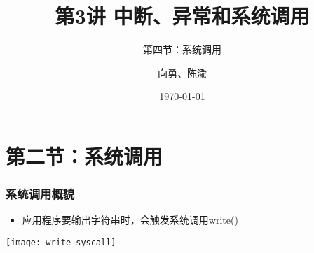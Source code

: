 


\title[第3讲]{第3讲 中断、异常和系统调用} %
\subtitle{第四节：系统调用}
\author{向勇、陈渝} %
\date{\today} %



\begin{frame}
\titlepage %
\end{frame}

\section{第二节：系统调用}%

\begin{frame}[plain]	
	\frametitle{系统调用概貌}
	
	\begin{itemize}
		\item 应用程序要输出字符串时，会触发系统调用write()
	\end{itemize}\pause
	
	
	\centering
	\texttt{[image: write-syscall]}
	
\end{frame}


